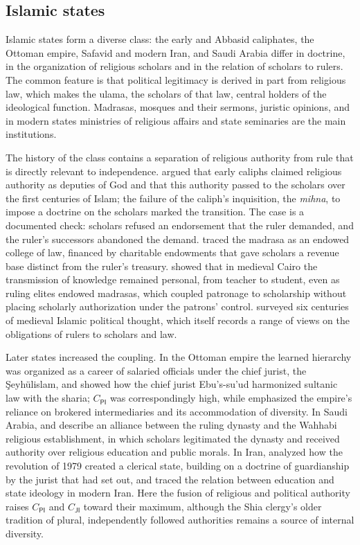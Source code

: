 \documentclass[11pt,letterpaper]{article}
\theoremstyle{definition}
\theoremstyle{remark}
\newcommand{\pP}{\mathsf{P}}
\newcommand{\pJ}{\mathsf{J}}
\newcommand{\pI}{\mathsf{I}}
\begin{document}
\subsection{Islamic states}

Islamic states form a diverse class: the early and Abbasid caliphates, the Ottoman empire, Safavid and modern Iran, and Saudi Arabia differ in doctrine, in the organization of religious scholars and in the relation of scholars to rulers. The common feature is that political legitimacy is derived in part from religious law, which makes the ulama, the scholars of that law, central holders of the ideological function. Madrasas, mosques and their sermons, juristic opinions, and in modern states ministries of religious affairs and state seminaries are the main institutions.

The history of the class contains a separation of religious authority from rule that is directly relevant to independence. \citet{crone1986} argued that early caliphs claimed religious authority as deputies of God and that this authority passed to the scholars over the first centuries of Islam; the failure of the caliph's inquisition, the \emph{mihna}, to impose a doctrine on the scholars marked the transition. The case is a documented check: scholars refused an endorsement that the ruler demanded, and the ruler's successors abandoned the demand. \citet{makdisi1981} traced the madrasa as an endowed college of law, financed by charitable endowments that gave scholars a revenue base distinct from the ruler's treasury. \citet{berkey1992} showed that in medieval Cairo the transmission of knowledge remained personal, from teacher to student, even as ruling elites endowed madrasas, which coupled patronage to scholarship without placing scholarly authorization under the patrons' control. \citet{crone2004} surveyed six centuries of medieval Islamic political thought, which itself records a range of views on the obligations of rulers to scholars and law.

Later states increased the coupling. In the Ottoman empire the learned hierarchy was organized as a career of salaried officials under the chief jurist, the \c{S}eyh\"ulislam, and \citet{imber1997} showed how the chief jurist Ebu's-su'ud harmonized sultanic law with the sharia; $C_{\pP\pI}$ was correspondingly high, while \citet{barkey2008} emphasized the empire's reliance on brokered intermediaries and its accommodation of diversity. In Saudi Arabia, \citet{commins2006} and \citet{alrasheed2002} describe an alliance between the ruling dynasty and the Wahhabi religious establishment, in which scholars legitimated the dynasty and received authority over religious education and public morals. In Iran, \citet{arjomand1988} analyzed how the revolution of 1979 created a clerical state, building on a doctrine of guardianship by the jurist that \citet{khomeini1981} had set out, and \citet{menashri1992} traced the relation between education and state ideology in modern Iran. Here the fusion of religious and political authority raises $C_{\pP\pI}$ and $C_{\pJ\pI}$ toward their maximum, although the Shia clergy's older tradition of plural, independently followed authorities remains a source of internal diversity.
\end{document}
